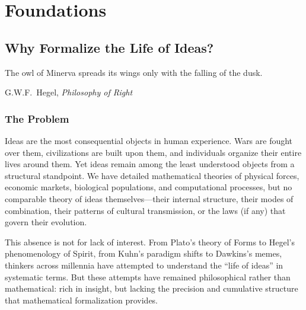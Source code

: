 \documentclass[11pt,openany]{book}
\theoremstyle{definition}
\theoremstyle{plain}
\theoremstyle{remark}
\begin{document}
\clearpage

\setcounter{tocdepth}{2}
\tableofcontents

\clearpage

\mainmatter

\part{Foundations}

\chapter{Why Formalize the Life of Ideas?}
\label{ch:intro}

\epigraph{The owl of Minerva spreads its wings only with the falling of the dusk.}{G.W.F.\ Hegel, \textit{Philosophy of Right}}

\section{The Problem}

Ideas are the most consequential objects in human experience. Wars are fought over them, civilizations are built upon them, and individuals organize their entire lives around them. Yet ideas remain among the least understood objects from a structural standpoint. We have detailed mathematical theories of physical forces, economic markets, biological populations, and computational processes, but no comparable theory of ideas themselves---their internal structure, their modes of combination, their patterns of cultural transmission, or the laws (if any) that govern their evolution.

This absence is not for lack of interest. From Plato's theory of Forms to Hegel's phenomenology of Spirit, from Kuhn's paradigm shifts to Dawkins's memes, thinkers across millennia have attempted to understand the ``life of ideas'' in systematic terms. But these attempts have remained philosophical rather than mathematical: rich in insight, but lacking the precision and cumulative structure that mathematical formalization provides.
\end{document}

